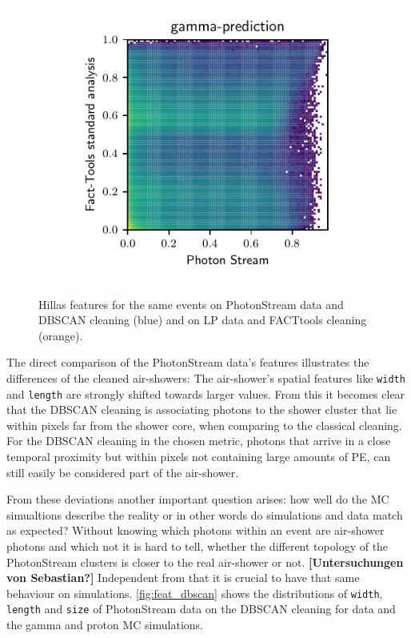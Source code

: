 \begin{figure}
\begin{subfigure}{0.5\textwidth}
  \end{subfigure}
  \begin{subfigure}{0.5\textwidth}
    \centering
    \includegraphics[width=\textwidth, page=4]{Plots/comparison_data_dl3.pdf}
  \end{subfigure}
  \caption{Hillas features for the same events on PhotonStream data and DBSCAN cleaning (blue) and on LP data and FACTtools cleaning (orange).}
  \label{fig:feat_comp}
\end{figure}
%
The direct comparison of the PhotonStream data's features illustrates the
differences of the cleaned air-showers: The air-shower's spatial features like
\texttt{width} and \texttt{length} are strongly shifted towards larger values.
From this it becomes clear that the DBSCAN cleaning is associating photons to
the shower cluster that lie within pixels far from the shower core, when
comparing to the classical cleaning. For the DBSCAN cleaning in the chosen
metric, photons that arrive in a close temporal proximity but within pixels not
containing large amounts of PE, can still easily be considered part of the
air-shower.

From these deviations another important question arises: how well do the MC
simualtions describe the reality or in other words do simulations and data
match as expected? Without knowing which photons within an event are air-shower
photons and which not it is hard to tell, whether the different topology of the
PhotonStream clusters is closer to the real air-shower or not.
\textbf{[Untersuchungen von Sebastian?]} Independent from that it is crucial to
have that same behaviour on simulations. \autoref{fig:feat_dbscan} shows the
distributions of \texttt{width}, \texttt{length} and \texttt{size} of
PhotonStream data on the DBSCAN cleaning for data and the gamma and proton MC
simulations.

